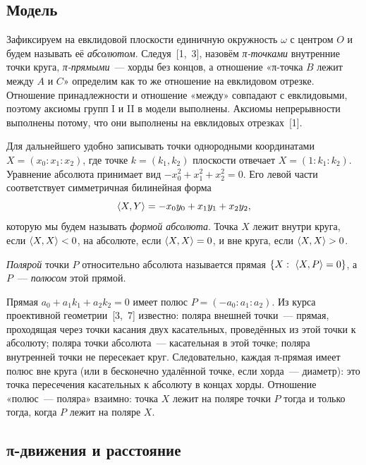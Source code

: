 \subsection{Модель}

Зафиксируем на евклидовой плоскости единичную окружность $\omega$ с центром $O$ и будем называть её \emph{абсолютом}. Следуя~[1,~3], назовём \emph{π-точками} внутренние точки круга, \emph{π-прямыми}~--- хорды без концов, а отношение «π-точка $B$ лежит между $A$ и $C$» определим как то же отношение на евклидовом отрезке. Отношение принадлежности и отношение «между» совпадают с евклидовыми, поэтому аксиомы групп I и II в модели выполнены. Аксиомы непрерывности выполнены потому, что они выполнены на евклидовых отрезках~[1].

Для дальнейшего удобно записывать точки однородными координатами $X=(x_0:x_1:x_2)$, где точке $k=(k_1,k_2)$ плоскости отвечает $X=(1:k_1:k_2)$. Уравнение абсолюта принимает вид $-x_0^2+x_1^2+x_2^2=0$. Его левой части соответствует симметричная билинейная форма
\begin{equation}\label{eq:forma}
\langle X,Y\rangle=-x_0y_0+x_1y_1+x_2y_2,
\end{equation}
которую мы будем называть \emph{формой абсолюта}. Точка $X$ лежит внутри круга, если $\langle X,X\rangle<0$, на абсолюте, если $\langle X,X\rangle=0$, и вне круга, если $\langle X,X\rangle>0$.

\begin{definition}
\emph{Полярой} точки $P$ относительно абсолюта называется прямая $\{X:\ \sk{X}{P}=0\}$, а $P$~--- \emph{полюсом} этой прямой.
\end{definition}

Прямая $a_0+a_1k_1+a_2k_2=0$ имеет полюс $P=(-a_0:a_1:a_2)$. Из курса проективной геометрии~[3,~7] известно: поляра внешней точки~--- прямая, проходящая через точки касания двух касательных, проведённых из этой точки к абсолюту; поляра точки абсолюта~--- касательная в этой точке; поляра внутренней точки не пересекает круг. Следовательно, каждая π-прямая имеет полюс вне круга (или в бесконечно удалённой точке, если хорда~--- диаметр): это точка пересечения касательных к абсолюту в концах хорды. Отношение «полюс~--- поляра» взаимно: точка $X$ лежит на поляре точки $P$ тогда и только тогда, когда $P$ лежит на поляре $X$.

\subsection{π-движения и расстояние}


